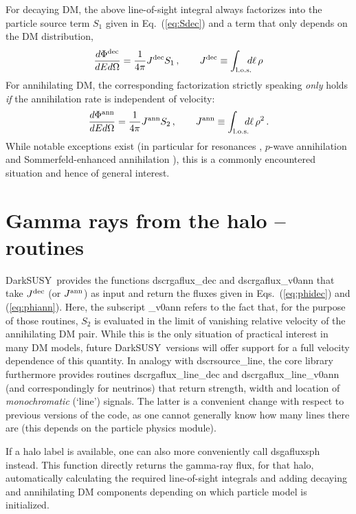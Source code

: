 \documentclass[a4paper,10pt,oneside]{book}
\newcommand{\be}{\begin{equation}}
\newcommand{\ee}{\end{equation}}
\newcommand{\code}[1]{\ft{#1}}
\newcommand{\ds}{{\sffamily DarkSUSY}}
\newcommand{\ft}[1]{\textsf{#1}}
\begin{document}
For decaying DM, the above line-of-sight integral always factorizes into the particle source term
$S_1$ given in Eq.~(\ref{eq:Sdec}) and a term that only depends on the DM distribution,
\be
\label{eq:phiann}
\frac{d\Phi^{\rm dec}}{dEd\Omega}= \frac1{4\pi}J^{\rm dec} S_1\,, \qquad J^{\rm dec} \equiv \int_{\rm l.o.s.}\!\!\!\!d\ell\, \rho
\ee
For annihilating DM, the corresponding factorization strictly speaking  {\it only} holds {\it if} the annihilation rate is independent of velocity:
\be
\label{eq:phidec}
\frac{d\Phi^{\rm ann}}{dEd\Omega}= \frac1{4\pi}J^{\rm ann} S_2\,, \qquad J^{\rm ann} \equiv \int_{\rm l.o.s.}\!\!\!\!d\ell\, \rho^2\,.
\ee
While notable exceptions exist (in particular for resonances \cite{Arina:2014fna}, $p$-wave annihilation \cite{xxx} and  
Sommerfeld-enhanced annihilation \cite{xxx}), this is a commonly encountered situation and hence of general interest.

\section{Gamma rays from the halo -- routines}

\ds\  provides the functions \code{dscrgaflux\_dec} and \code{dscrgaflux\_v0ann} that take $J^{\rm dec}$ 
(or $J^{\rm ann}$)  as input and return the fluxes given in  Eqs.~(\ref{eq:phidec}) and (\ref{eq:phiann}). Here, the subscript \code{\_v0ann} refers to the fact that, for the
purpose of those routines, $S_2$ is evaluated
in the limit of vanishing relative velocity of the annihilating DM pair. While this is the only situation of practical 
interest in many DM models, future \ds\ versions will offer support for a full velocity dependence of this quantity.
In analogy with \code{dscrsource\_line}, the \code{core} library furthermore provides
routines \code{dscrgaflux\_line\_dec} and \code{dscrgaflux\_line\_v0ann} (and correspondingly for neutrinos) 
that return strength, width and location of {\it monochromatic} (`line') signals. The latter is a convenient
change with respect to previous versions of the code,  as one cannot generally know how many lines there
are (this depends on the particle physics module).

If a halo label is available, one can also 
more conveniently call \code{dsgafluxsph} instead. This function  directly returns the gamma-ray flux,
for that halo, 
automatically calculating the required line-of-sight integrals and adding decaying and annihilating DM
components depending on which particle model is initialized. 
\end{document}
